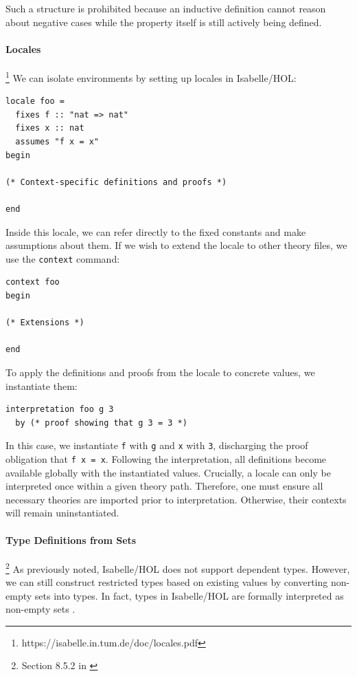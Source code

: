 \documentclass[11pt]{article}
\begin{document}
Such a structure is prohibited because an inductive definition cannot reason about negative cases
while the property itself is still actively being defined.

\paragraph{Locales}\footnote{https://isabelle.in.tum.de/doc/locales.pdf}
We can isolate environments by setting up locales in Isabelle/HOL:

\begin{verbatim}
locale foo =
  fixes f :: "nat => nat"
  fixes x :: nat
  assumes "f x = x"
begin

(* Context-specific definitions and proofs *)

end
\end{verbatim}

Inside this locale, we can refer directly to the fixed constants and make assumptions about them.
If we wish to extend the locale to other theory files, we use the \texttt{context} command:

\begin{verbatim}
context foo
begin

(* Extensions *)

end
\end{verbatim}

To apply the definitions and proofs from the locale to concrete values, we instantiate them:

\begin{verbatim}
interpretation foo g 3
  by (* proof showing that g 3 = 3 *)
\end{verbatim}

In this case, we instantiate \texttt{f} with \texttt{g} and \texttt{x} with \texttt{3}, discharging the proof obligation that \texttt{f x = x}.
Following the interpretation, all definitions become available globally with the instantiated values.
Crucially, a locale can only be interpreted once within a given theory path.
Therefore, one must ensure all necessary theories are imported prior to interpretation.
Otherwise, their contexts will remain uninstantiated.

\paragraph{Type Definitions from Sets}\footnote{Section 8.5.2 in \cite{nipkow2002isabelle}}
As previously noted, Isabelle/HOL does not support dependent types.
However, we can still construct restricted types based on existing values by converting non-empty sets into types.
In fact, types in Isabelle/HOL are formally interpreted as non-empty sets \cite{kunvcar2016types}.
\end{document}
